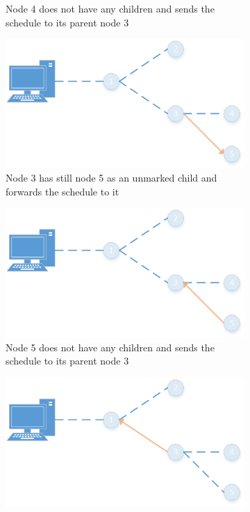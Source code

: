 \begin{figure}[htbp]
\begin{subfigure}[t]{0.4\textwidth}
        \caption{Node 4 does not have any children and sends the schedule to its parent node 3}
        \label{fig:link}
    \end{subfigure}
    \quad
    \quad
    \begin{subfigure}[t]{0.4\textwidth}
		\centering         
        \includegraphics[scale=0.6]{content/images/ScheduleSpreading/Part7}
        \caption{Node 3 has still node 5 as an unmarked child and forwards the schedule to it}
        \label{fig:link}
    \end{subfigure}
    \quad
    \quad
    \begin{subfigure}[t]{0.4\textwidth}
		\centering         
        \includegraphics[scale=0.6]{content/images/ScheduleSpreading/Part8}
        \caption{Node 5 does not have any children and sends the schedule to its parent node 3}
        \label{fig:link}
    \end{subfigure}
    \quad
    \quad
    \begin{subfigure}[t]{0.4\textwidth}
		\centering
    		\includegraphics[scale=0.6]{content/images/ScheduleSpreading/Part9}

\end{subfigure}
\end{figure}
